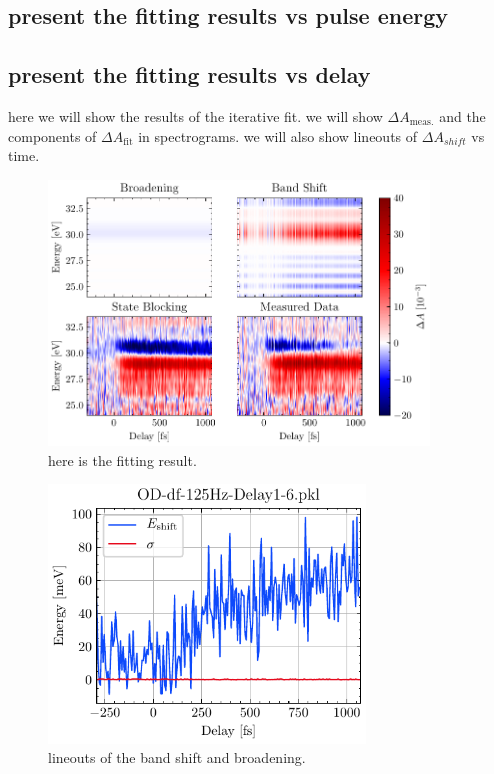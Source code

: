 \subsection{present the fitting results vs pulse energy}

\subsection{present the fitting results vs delay}
here we will show the results of the iterative fit. we will show $\Delta A_{\textrm{meas.}}$ and the components of $\Delta A_{\textrm{fit}}$ in spectrograms. we will also show lineouts of $\Delta A_{shift}$ vs time.

\begin{figure}
	\centering
	\includegraphics[width=0.9\textwidth]{figures/chap4/OD_df_125Hz_Delay1-6+fit_result.pdf}
	\caption{here is the fitting result.}
	\label{fig:OD_df_125Hz_Delay1-6+fit_result}
\end{figure}

\begin{figure}
	\centering
	\includegraphics[width=0.75\textwidth]{figures/chap4/OD_df_125Hz_Delay1-6_shift_broad.pdf}
	\caption{lineouts of the band shift and broadening.}
	\label{fig:OD_df_125Hz_Delay1-6_shift_broad}
\end{figure}

